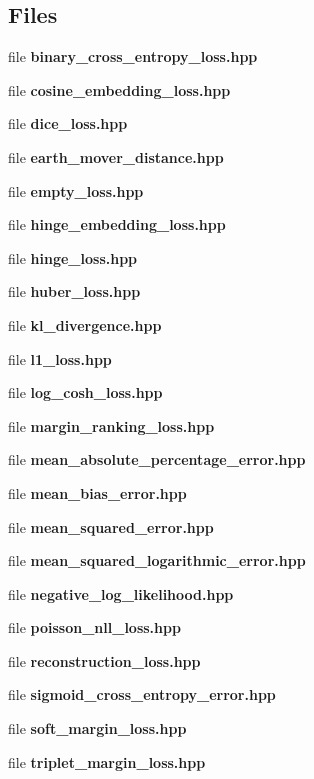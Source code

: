 \subsection*{Files}
\begin{DoxyCompactItemize}
\item 
file \textbf{ binary\+\_\+cross\+\_\+entropy\+\_\+loss.\+hpp}
\item 
file \textbf{ cosine\+\_\+embedding\+\_\+loss.\+hpp}
\item 
file \textbf{ dice\+\_\+loss.\+hpp}
\item 
file \textbf{ earth\+\_\+mover\+\_\+distance.\+hpp}
\item 
file \textbf{ empty\+\_\+loss.\+hpp}
\item 
file \textbf{ hinge\+\_\+embedding\+\_\+loss.\+hpp}
\item 
file \textbf{ hinge\+\_\+loss.\+hpp}
\item 
file \textbf{ huber\+\_\+loss.\+hpp}
\item 
file \textbf{ kl\+\_\+divergence.\+hpp}
\item 
file \textbf{ l1\+\_\+loss.\+hpp}
\item 
file \textbf{ log\+\_\+cosh\+\_\+loss.\+hpp}
\item 
file \textbf{ margin\+\_\+ranking\+\_\+loss.\+hpp}
\item 
file \textbf{ mean\+\_\+absolute\+\_\+percentage\+\_\+error.\+hpp}
\item 
file \textbf{ mean\+\_\+bias\+\_\+error.\+hpp}
\item 
file \textbf{ mean\+\_\+squared\+\_\+error.\+hpp}
\item 
file \textbf{ mean\+\_\+squared\+\_\+logarithmic\+\_\+error.\+hpp}
\item 
file \textbf{ negative\+\_\+log\+\_\+likelihood.\+hpp}
\item 
file \textbf{ poisson\+\_\+nll\+\_\+loss.\+hpp}
\item 
file \textbf{ reconstruction\+\_\+loss.\+hpp}
\item 
file \textbf{ sigmoid\+\_\+cross\+\_\+entropy\+\_\+error.\+hpp}
\item 
file \textbf{ soft\+\_\+margin\+\_\+loss.\+hpp}
\item 
file \textbf{ triplet\+\_\+margin\+\_\+loss.\+hpp}
\end{DoxyCompactItemize}
